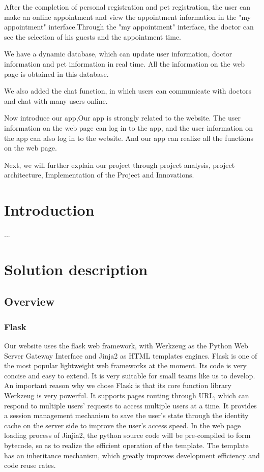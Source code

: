\documentclass[a4paper]{article}
\begin{document}
After the completion of personal registration and pet registration, the user can make an online appointment and view the appointment information in the "my appointment" interface.Through the "my appointment" interface, the doctor can see the selection of his guests and the appointment time.

We have a dynamic database, which can update user information, doctor information and pet information in real time. All the information on the web page is obtained in this database.

We also added the chat function, in which users can communicate with doctors and chat with many users online.

Now introduce our app,Our app is strongly related to the website. The user information on the web page can log in to the app, and the user information on the app can also log in to the website. And our app can realize all the functions on the web page. 

Next, we will further explain our project through project analysis, project architecture, Implementation of the Project and Innovations.

\section{Introduction}

...

\section{Solution description}
\subsection{Overview}
\subsubsection{Flask}
Our website uses the flask web framework, with Werkzeug as the Python Web Server Gateway Interface and Jinja2 as HTML templates engines. Flask is one of the most popular lightweight web frameworks at the moment. Its code is very concise and easy to extend. It is very suitable for small teams like us to develop.
An important reason why we chose Flask is that its core function library Werkzeug is very powerful. It supports pages routing through URL, which can respond to multiple users' requests to access multiple users at a time. It provides a session management mechanism to save the user's state through the identity cache on the server side to improve the user's access speed.
In the web page loading process of Jinjia2, the python source code will be pre-compiled to form bytecode, so as to realize the efficient operation of the template. The template has an inheritance mechanism, which greatly improves development efficiency and code reuse rates.
\end{document}
